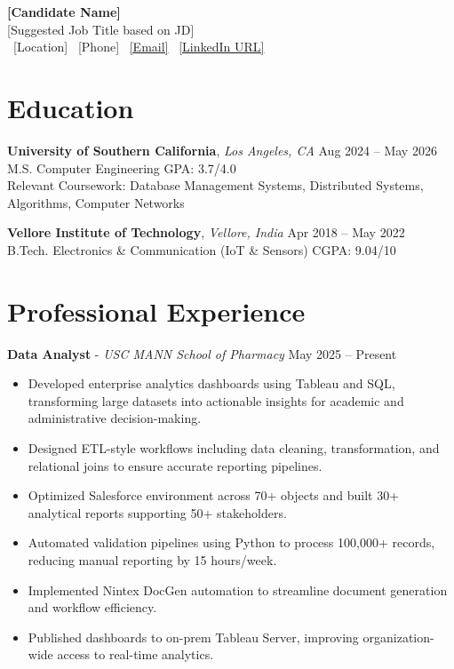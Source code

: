 \documentclass[letterpaper,11pt]{article}
\begin{document}
\begin{center}
    {\LARGE \textbf{[Candidate Name]}}\\
    {\normalsize [Suggested Job Title based on JD]} \\
    \small
    \faMapMarker*\ [Location]
    \quad
    \faPhone*\ [Phone]
    \quad
    \faEnvelope\ \href{mailto:[Email]}{[Email]}
    \quad
    \faLinkedin\ \href{[LinkedIn URL]}{[LinkedIn URL]}
\end{center}
\vspace{-13pt}

\section*{Education}

\textbf{University of Southern California}, \textit{Los Angeles, CA} \hfill Aug 2024 -- May 2026 \\
M.S. Computer Engineering \hfill GPA: 3.7/4.0 \\
Relevant Coursework: Database Management Systems, Distributed Systems, Algorithms, Computer Networks

\vspace{4pt}

\textbf{Vellore Institute of Technology}, \textit{Vellore, India }\hfill Apr 2018 -- May 2022 \\
B.Tech. Electronics \& Communication (IoT \& Sensors) \hfill CGPA: 9.04/10

\section*{Professional Experience}

\textbf{Data Analyst} - \textit{USC MANN School of Pharmacy} \hfill May 2025 -- Present
\begin{itemize}
\item Developed enterprise analytics dashboards using Tableau and SQL, transforming large datasets into actionable insights for academic and administrative decision-making.
\item Designed ETL-style workflows including data cleaning, transformation, and relational joins to ensure accurate reporting pipelines.
\item Optimized Salesforce environment across 70+ objects and built 30+ analytical reports supporting 50+ stakeholders.
\item Automated validation pipelines using Python to process 100,000+ records, reducing manual reporting by 15 hours/week.
\item Implemented Nintex DocGen automation to streamline document generation and workflow efficiency.
\item Published dashboards to on-prem Tableau Server, improving organization-wide access to real-time analytics.
\end{itemize}
\end{document}
